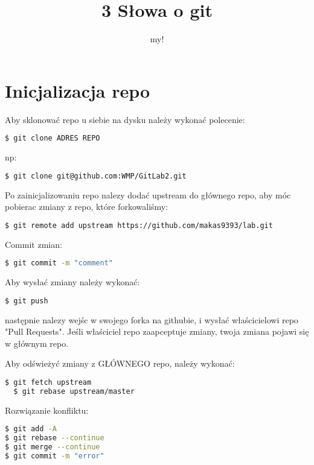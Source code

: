\documentclass[12pt,a4paper]{book}
\author{my!}
\title{3 Słowa o git}
\begin{document}
\maketitle

\chapter{Inicjalizacja repo}
Aby sklonować repo u siebie na dysku należy wykonać polecenie:
\begin{lstlisting}[language=bash]
  $ git clone ADRES REPO
\end{lstlisting}
np:
\begin{lstlisting}[language=bash]
  $ git clone git@github.com:WMP/GitLab2.git
\end{lstlisting}
Po zainicjalizowaniu repo nalezy dodać upstream do głównego repo, aby móc pobierac zmiany z repo, które forkowaliśmy:
\begin{lstlisting}[language=bash]
  $ git remote add upstream https://github.com/makas9393/lab.git
\end{lstlisting}

Commit zmian:
\begin{lstlisting}[language=bash]
  $ git commit -m "comment"
\end{lstlisting}

Aby wysłać zmiany należy wykonać:
\begin{lstlisting}[language=bash]
  $ git push
\end{lstlisting}
następnie nalezy wejśc w swojego forka na githubie, i wysłać właścicielowi repo "Pull Requests". Jeśli właściciel repo zaapceptuje zmiany, twoja zmiana pojawi się w głównym repo. 

Aby odświeżyć zmiany z GŁÓWNEGO repo, należy wykonać:
\begin{lstlisting}[language=bash]
  $ git fetch upstream
  $ git rebase upstream/master
\end{lstlisting}

Rozwiązanie konfliktu:
\begin{lstlisting}[language=bash]
$ git add -A
$ git rebase --continue
$ git merge --continue
$ git commit -m "error"
\end{lstlisting}
\end{document}
